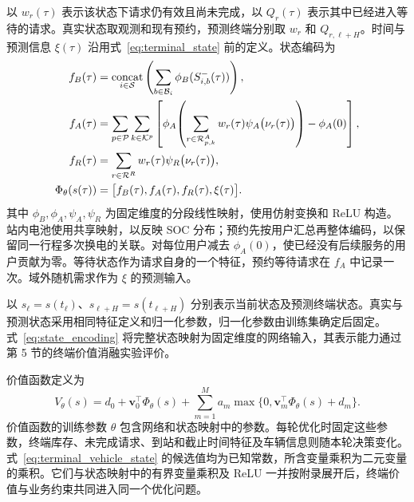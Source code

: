 以 $w_r(\tau)$ 表示该状态下请求仍有效且尚未完成，以 $Q_r(\tau)$ 表示其中已经进入等待的请求。真实状态取观测和现有预约，预测终端分别取 $w_r$ 和 $Q_{r,\ell+H}$。时间与预测信息 $\xi(\tau)$ 沿用式~\eqref{eq:terminal_state} 前的定义。状态编码为
\begin{equation}
\begin{aligned}
f_B(\tau)&=\mathop{\mathrm{concat}}_{i\in\mathcal S}
\left(\sum_{b\in\mathcal B_i}\phi_B(S_{i,b}^{-}(\tau))\right),\\
f_A(\tau)&=\sum_{p\in\mathcal P}\sum_{k\in\mathcal K^p}
\left[\phi_A\!\left(\sum_{r\in\mathcal R_{p,k}^A}w_r(\tau)\psi_A\bigl(\nu_r(\tau)\bigr)\right)-\phi_A(0)\right],\\
f_R(\tau)&=\sum_{r\in\mathcal R^R}w_r(\tau)\psi_R\bigl(\nu_r(\tau)\bigr),\\
\Phi_\theta(s(\tau))&=\bigl[f_B(\tau),f_A(\tau),f_R(\tau),\xi(\tau)\bigr].
\end{aligned}
\label{eq:state_encoding}
\end{equation}
其中 $\phi_B,\phi_A,\psi_A,\psi_R$ 为固定维度的分段线性映射，使用仿射变换和 ReLU 构造。站内电池使用共享映射，以反映 SOC 分布；预约先按用户汇总再整体编码，以保留同一行程多次换电的关联。对每位用户减去 $\phi_A(0)$，使已经没有后续服务的用户贡献为零。等待状态作为请求自身的一个特征，预约等待请求在 $f_A$ 中记录一次。域外随机需求作为 $\xi$ 的预测输入。

以 $s_\ell=s(t_\ell)$、$s_{\ell+H}=s(t_{\ell+H})$ 分别表示当前状态及预测终端状态。真实与预测状态采用相同特征定义和归一化参数，归一化参数由训练集确定后固定。式~\eqref{eq:state_encoding} 将完整状态映射为固定维度的网络输入，其表示能力通过第 5 节的终端价值消融实验评价。

价值函数定义为
\begin{equation}
V_\theta(s)
=d_0+\boldsymbol v_0^\top\Phi_\theta(s)
+\sum_{m=1}^{M}a_m\max\{0,\boldsymbol v_m^\top\Phi_\theta(s)+d_m\}.
\label{eq:value_network}
\end{equation}
价值函数的训练参数 $\theta$ 包含网络和状态映射中的参数。每轮优化时固定这些参数，终端库存、未完成请求、到站和截止时间特征及车辆信息则随本轮决策变化。式~\eqref{eq:terminal_vehicle_state} 的候选值均为已知常数，所含变量乘积为二元变量的乘积。它们与状态映射中的有界变量乘积及 ReLU 一并按附录展开后，终端价值与业务约束共同进入同一个优化问题。

